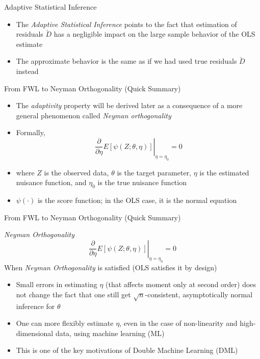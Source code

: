 \documentclass[aspectratio=1610,12pt,xcolor=dvipsnames]{beamer}
\begin{document}
\begin{frame}{Adaptive Statistical Inference}
 \begin{itemize}
     \item The \textit{Adaptive Statistical Inference} points to the fact that estimation of residuals $\check{D}$ has a negligible impact on the large sample behavior of the OLS estimate
     \item The approximate behavior is the same as if we had used true residuals $\check D$ instead
 \end{itemize}
\end{frame}

\begin{frame}{From FWL to Neyman Orthogonality (Quick Summary)}

\begin{itemize}
    \item The \textit{adaptivity} property will be derived later as a consequence of a more general phenomenon called \textit{Neyman orthogonality}
    \item Formally, \[
    \left.\frac{\partial}{\partial \eta} E[\psi(Z;\theta,\eta)]\right|_{\eta=\eta_0} = 0
    \]
    \item where $Z$ is the observed data, $\theta$ is the target parameter, $\eta$ is the estimated nuisance function, and $\eta_0$ is the true nuisance function
    \item $\psi(\cdot)$ is the score function; in the OLS case, it is the normal equation
\end{itemize}
\end{frame}

\begin{frame}{From FWL to Neyman Orthogonality (Quick Summary)}

\textit{Neyman Orthogonality}
\[
    \left.\frac{\partial}{\partial \eta} E[\psi(Z;\theta,\eta)]\right|_{\eta=\eta_0} = 0
    \]
When \textit{Neyman Orthogonality} is satisfied (OLS satisfies it by design)
    \begin{itemize}
        \item Small errors in estimating $\eta$ (that affects moment only at second order) does not change the fact that one still get $\sqrt{n}$-consistent, asymptotically normal inference for $\theta$
        \item One can more flexibly estimate $\eta$, even in the case of non-linearity and high-dimensional data, using machine learning (ML)
        \item This is one of the key motivations of Double Machine Learning (DML)
    \end{itemize}
\end{frame}
\end{document}
